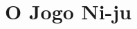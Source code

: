 \documentclass[a4paper]{article}
\begin{document}

\newpage

%
%
%
%
%
%
%


\section{O Jogo Ni-ju}
\end{document}
